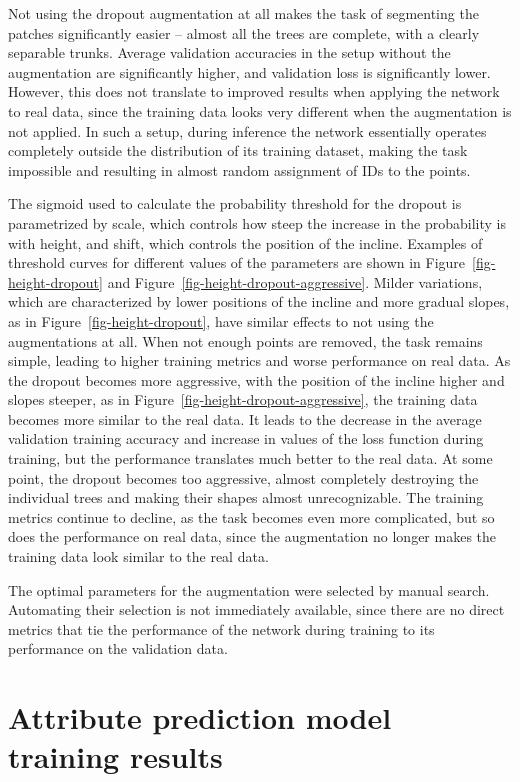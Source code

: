 Not using the dropout augmentation at all makes the task of segmenting the patches significantly easier – almost all the trees are complete, with a clearly separable trunks.
Average validation accuracies in the setup without the augmentation are significantly higher, and validation loss is significantly lower.
However, this does not translate to improved results when applying the network to real data, since the training data looks very different when the augmentation is not applied.
In such a setup, during inference the network essentially operates completely outside the distribution of its training dataset, making the task impossible and resulting in almost random assignment of IDs to the points.

The sigmoid used to calculate the probability threshold for the dropout is parametrized by scale, which controls how steep the increase in the probability is with height, and shift, which controls the position of the incline.
Examples of threshold curves for different values of the parameters are shown in Figure~\ref{fig-height-dropout} and Figure~\ref{fig-height-dropout-aggressive}.
Milder variations, which are characterized by lower positions of the incline and more gradual slopes, as in Figure~\ref{fig-height-dropout}, have similar effects to not using the augmentations at all.
When not enough points are removed, the task remains simple, leading to higher training metrics and worse performance on real data.
As the dropout becomes more aggressive, with the position of the incline higher and slopes steeper, as in Figure~\ref{fig-height-dropout-aggressive}, the training data becomes more similar to the real data.
It leads to the decrease in the average validation training accuracy and increase in values of the loss function during training, but the performance translates much better to the real data.
At some point, the dropout becomes too aggressive, almost completely destroying the individual trees and making their shapes almost unrecognizable.
The training metrics continue to decline, as the task becomes even more complicated, but so does the performance on real data, since the augmentation no longer makes the training data look similar to the real data.

The optimal parameters for the augmentation were selected by manual search.
Automating their selection is not immediately available, since there are no direct metrics that tie the performance of the network during training to its performance on the validation data.

\section{Attribute prediction model training results}

